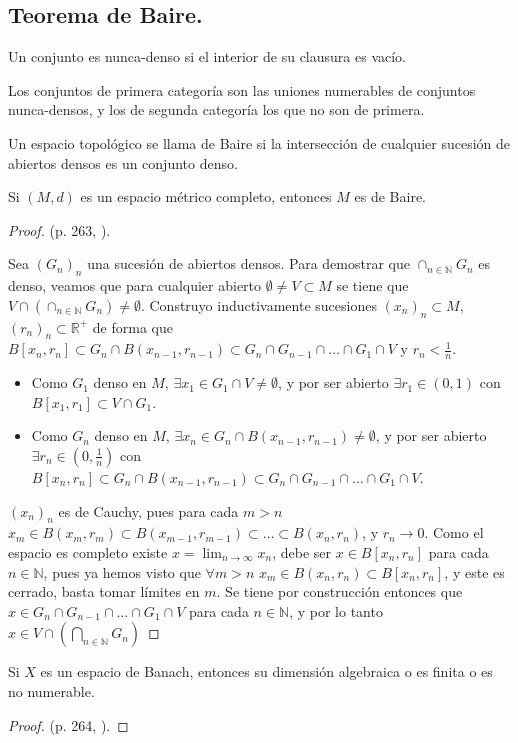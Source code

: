 \subsection{Teorema de Baire.}

\begin{definition}
  Un conjunto es nunca-denso si el interior de su clausura es vacío.
\end{definition}

\begin{definition}
  Los conjuntos de primera categoría son las uniones numerables de conjuntos
  nunca-densos, y los de segunda categoría los que no son de primera.
\end{definition}

\begin{definition}
  Un espacio topológico se llama de Baire si la intersección de cualquier
  sucesión de abiertos densos es un conjunto denso.
\end{definition}

\begin{theorem}[Baire]
  \label{th:baire}
  Si $(M,d)$ es un espacio métrico completo, entonces $M$ es de Baire.
\end{theorem}
\begin{proof}
  (p. 263, \cite{cascales2012}).

  Sea $(G_n)_n$ una sucesión de abiertos densos. Para demostrar que $\cap_{n\in
  \mathbb{N}} G_n$ es denso, veamos que para cualquier abierto $\emptyset\neq
  V\subset M$ se tiene que $V\cap \left( \cap _{n\in \mathbb{N}}G_n \right) \neq
  \emptyset$. Construyo inductivamente sucesiones $(x_n)_n\subset M$,
  $(r_n)_n\subset \mathbb{R}^+$ de forma que $B[x_n,r_n] \subset G_n\cap
  B(x_{n-1},r_{n-1}) \subset G_n \cap G_{n-1}\cap \ldots\cap G_1 \cap V$ y $r_n
  < \frac{1}{n}$.

  \begin{itemize}
    \item Como $G_1$ denso en $M$, $\exists x_1 \in G_1\cap V\neq \emptyset$, y
      por ser abierto $\exists r_1 \in (0,1)$ con $B[x_1,r_1] \subset V\cap
      G_1$.
    \item Como $G_n$ denso en $M$, $\exists x_n \in G_n\cap
      B(x_{n-1},r_{n-1})\neq \emptyset$, y por ser abierto $\exists r_n \in
      (0,\frac{1}{n})$ con $B[x_n,r_n] \subset G_n\cap B(x_{n-1},r_{n-1})
      \subset G_n \cap G_{n-1}\cap \ldots\cap G_1 \cap V$.
  \end{itemize}

  $(x_n)_n$ es de Cauchy, pues para cada $m>n$  $x_m \in B(x_m,r_m)\subset
  B(x_{m-1},r_{m-1})\subset \ldots\subset B(x_n,r_n)$, y $r_n\to 0$. Como el
  espacio es completo existe $x=\lim_{n \to \infty} x_n$, debe ser $x\in
  B[x_n,r_n]$ para cada $n\in \mathbb{N}$, pues ya hemos visto que $\forall m>n$ 
  $x_m\in B(x_n,r_n)\subset B[x_n,r_n]$, y este es cerrado, basta tomar límites
  en $m$. Se tiene por construcción entonces que $x\in G_n \cap G_{n-1}\cap
  \ldots\cap G_1 \cap V$ para cada $n\in \mathbb{N}$, y por lo tanto $x\in V\cap
  \left( \bigcap_{n\in \mathbb{N}} G_n \right) $
\end{proof}

\begin{corollary}
  Si $X$ es un espacio de Banach, entonces su dimensión algebraica o es finita o
  es no numerable.
\end{corollary}

\begin{proof}
  (p. 264, \cite{cascales2012}).
\end{proof}

